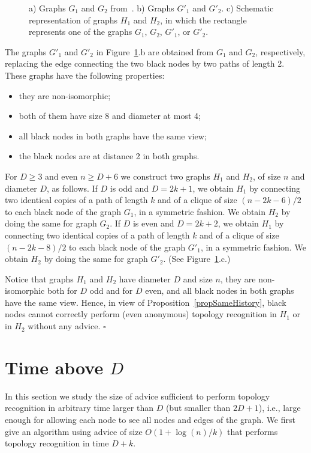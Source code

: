 \documentclass{article}
\newcommand*{\qed}{\hfill\ensuremath{\square}}
\newenvironment{proof}{\noindent{\bf Proof:}}{\qed}
\begin{document}
\begin{proof}
\begin{figure}
\caption{\label{fig.yk} a) Graphs $G_1$ and $G_2$ from~\cite{YK3}. b) Graphs $G'_1$ and $G'_2$. c) Schematic representation of graphs $H_1$ and $H_2$, in which the rectangle represents one of the graphs $G_1$, $G_2$, $G'_1$, or $G'_2$.  }
\end{figure}


The graphs $G'_1$ and $G'_2$ in Figure~\ref{fig.yk}.b are obtained from  $G_1$ and $G_2$, respectively, replacing the edge connecting the two black nodes by two paths of length 2.
These graphs have the following properties:
\begin{itemize}
\item they are non-isomorphic;
\item both of them have size 8 and diameter at most 4;
\item all black nodes in both graphs have the same view;
\item the black nodes are at distance 2 in both graphs.
\end{itemize}
For $D\ge 3$ and even $n\ge D+6$ we construct two graphs $H_1$ and $H_2$, of size $n$ and diameter $D$, as follows.
If $D$ is odd and $D=2k+1$, we obtain $H_1$ by  connecting two identical copies of a path of length $k$ and of a clique of size $(n-2k -6)/2$ to each black node of the graph $G_1$, in a symmetric fashion.
We obtain $H_2$ by doing the same for graph $G_2$.
If $D$ is even and $D=2k+2$, we obtain $H_1$ by  connecting two identical copies of a path of length $k$ and of a clique of size $(n-2k -8)/2$ to each black node of the graph $G'_1$, in a symmetric fashion.
We obtain $H_2$ by doing the same for graph $G'_2$. (See Figure~\ref{fig.yk}.c.)

Notice that graphs $H_1$ and $H_2$ have diameter $D$ and size $n$, they are non-isomorphic both for $D$ odd and for $D$ even, and all black nodes in both graphs have the same view. Hence, in view of Proposition~\ref{propSameHistory}, black nodes cannot correctly perform (even anonymous) topology recognition in $H_1$ or in $H_2$ without any advice. 
\end{proof}






\section{Time above $D$}
In this section we study the size of advice sufficient to perform topology recognition in arbitrary time larger than $D$ (but smaller than $2D+1$), i.e., large enough for allowing each node to see all nodes and edges of the graph.
We first give an algorithm using advice of size $O(1+\log(n)/k)$ that performs topology recognition in time $D+k$.
\end{document}
